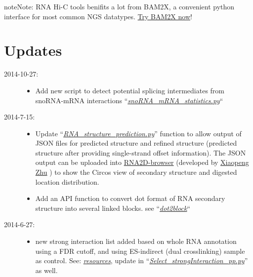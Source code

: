 \documentclass[letterpaper,10pt,english]{sphinxmanual}
\begin{document}
\begin{notice}{note}{Note:}
RNA Hi-C tools benifits a lot from BAM2X, a convenient python interface for most common NGS datatypes. \href{http://www.bam2x.net/}{Try BAM2X now}!
\end{notice}


\chapter{Updates}
\label{index:updates}\begin{description}
\item[{2014-10-27:}] \leavevmode\begin{itemize}
\item {} 
Add new script to detect potential splicing intermediates from snoRNA-mRNA interactions ``{\hyperref[Analysis_pipeline:snorna-mrna]{\emph{snoRNA\_mRNA\_statistics.py}}}``

\end{itemize}

\item[{2014-7-15:}] \leavevmode\begin{itemize}
\item {} 
Update ``{\hyperref[Analysis_pipeline:structure]{\emph{RNA\_structure\_prediction.py}}}'' function to allow output of JSON files for predicted structure and refined structure (predicted structure after providing single-strand offset information). The JSON output can be uploaded into \href{http://circos.zhu.land/}{RNA2D-browser} (developed by \href{https://github.com/nimezhu}{Xiaopeng Zhu} ) to show the Circos view of secondary structure and digested location distribution.

\item {} 
Add an API function to convert dot format of RNA secondary structure into several linked blocks. see ``{\hyperref[Other_api:dot2block]{\emph{dot2block}}}``

\end{itemize}

\item[{2014-6-27:}] \leavevmode\begin{itemize}
\item {} 
new strong interaction list added based on whole RNA annotation using a FDR cutoff, and using ES-indirect (dual crosslinking) sample as control. See: {\hyperref[Data_Resources:sifdr]{\emph{resources}}}, update in ``{\hyperref[Analysis_pipeline:step6]{\emph{Select\_strongInteraction\_pp.py}}}'' as well.


\end{itemize}
\end{description}
\end{document}
